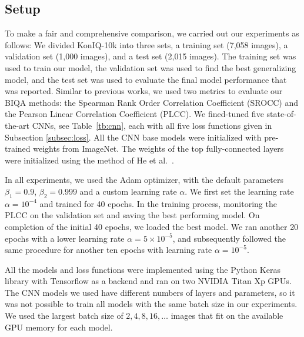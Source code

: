 \documentclass[10pt,journal,compsoc]{IEEEtran}
\begin{document}
\subsection{Setup}
To make a fair and comprehensive comparison, we carried out our experiments as follows: We divided KonIQ-10k into three sets, a training set (7,058 images), a validation set (1,000 images), and a test set (2,015 images). The training set was used to train our model, the validation set was used to find the best generalizing model, and the test set was used to evaluate the final model performance that was reported.
Similar to previous works, we used two metrics to evaluate our BIQA methods: the Spearman Rank Order Correlation Coefficient (SROCC) and the Pearson Linear Correlation Coefficient (PLCC). We fined-tuned five state-of-the-art CNNs, see Table~\ref{tb:cnn}, each with all five loss functions given in Subsection \ref{subsec:loss}. All the CNN base models were initialized with pre-trained weights from ImageNet. The weights of the top fully-connected layers were initialized using the method of He et al.~\cite{henormal}. 

In all experiments, we used the Adam \cite{kingma2014adam} optimizer, with the default parameters $\beta_1 = 0.9$, $\beta_2 = 0.999$ and a custom learning rate $\alpha$. We first set the learning rate $\alpha = 10^{-4}$ and trained for 40 epochs. In the training process, monitoring the PLCC on the validation set and saving the best performing model. On completion of the initial 40 epochs, we loaded the best model. We ran another 20 epochs with a lower learning rate $\alpha = 5\times10^{-5}$, and subsequently followed the same procedure for another ten epochs with learning rate $\alpha = 10^{-5}$.

All the models and loss functions were implemented using the Python Keras library with Tensorflow as a backend \cite{keras} and ran on two NVIDIA Titan Xp GPUs. The CNN models we used have different numbers of layers and parameters, so it was not possible to train all models with the same batch size in our experiments. We used the largest batch size of $2, 4, 8, 16, \ldots$ images that fit on the available GPU memory for each model.
\end{document}
